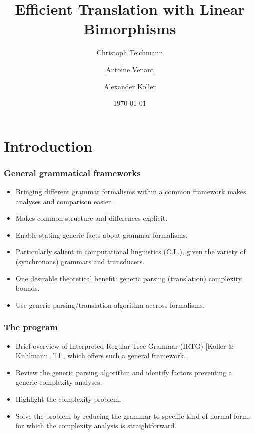 \documentclass{beamer}
\begin{document}
\title{Efficient Translation with Linear Bimorphisms} 
\author[Antoine Venant]{Christoph Teichmann \and \underline{Antoine Venant} \and Alexander Koller}
\date{\today}
\maketitle


\section{Introduction}

\begin{frame}
  \frametitle{General grammatical frameworks}
  \begin{itemize}
  \item Bringing different grammar formalisms within a common framework makes analyses and comparison easier.
  \item Makes common structure and differences explicit.
  \item Enable stating generic facts about grammar formalisms.  
  \item Particularly salient in computational linguistics (C.L.), given the variety of (synchronous) grammars and transducers.
  \item One desirable theoretical benefit: generic parsing (translation) complexity bounds.
  \item Use generic parsing/translation algorithm accross formalisms.
  \end{itemize}
\end{frame}

\begin{frame}
  \frametitle{The program}
  \begin{itemize}
  \item Brief overview of Interpreted Regular Tree Grammar (IRTG) [Koller \& Kuhlmann, '11], which offers such a general framework.
  \item Review the generic parsing algorithm and identify factors preventing a generic complexity analyses.
  \item Highlight the complexity problem.
  \item Solve the problem by reducing the grammar to specific kind of normal form, for which the complexity analysis is straightforward.
  \end{itemize}
\end{frame}
\end{document}
